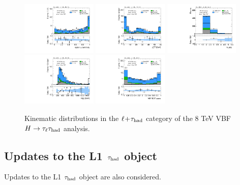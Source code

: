 \begin{figure}[tp]
  \includegraphics[width=0.32\textwidth]{figures/vbf-LTT/lep-eta-centrality}
  \includegraphics[width=0.32\textwidth]{figures/vbf-LTT/system-pt}
  \includegraphics[width=0.32\textwidth]{figures/vbf-LTT/n-jets30}
  \includegraphics[width=0.32\textwidth]{figures/vbf-LTT/dijet-m-high}
  \includegraphics[width=0.32\textwidth]{figures/vbf-LTT/BDTEve-VBF}
  \caption{Kinematic distributions in the $\ell\!+\!\tau_\text{had}$ category of the 8 TeV VBF $H\rightarrow\tau_\ell\tau_\text{had}$ analysis.}
  \label{fig:prospects-ltt-jets}
\end{figure}
\clearpage

\subsection{Updates to the L1 $\tau_\text{had}$ object}

Updates to the L1 $\tau_\text{had}$ object are also considered. 


